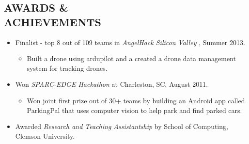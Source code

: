 \documentclass[line,margin]{res}
\begin{document}
\begin{resume}
		\section{AWARDS \& \\ ACHIEVEMENTS}
		\begin{itemize}  \itemsep -2pt             
			\item Finalist - top 8 out of 109 teams in {\it AngelHack Silicon Valley} , Summer 2013.
			\begin{itemize}  \itemsep -4pt 
				\item Built a drone using ardupilot and a created a drone data management system for tracking drones.
			\end{itemize}
			\item Won {\it SPARC-EDGE Hackathon} at Charleston, SC, August 2011.
			\begin{itemize}  \itemsep -4pt 
				\item Won joint first prize out of 30+ teams by building an Android app called ParkingPal that uses computer vision to help park and find parked cars.
			\end{itemize}
			\item Awarded {\it Research and Teaching Assistantship} by School of Computing, Clemson University.
		\end{itemize}
	\end{resume}
\end{document}
